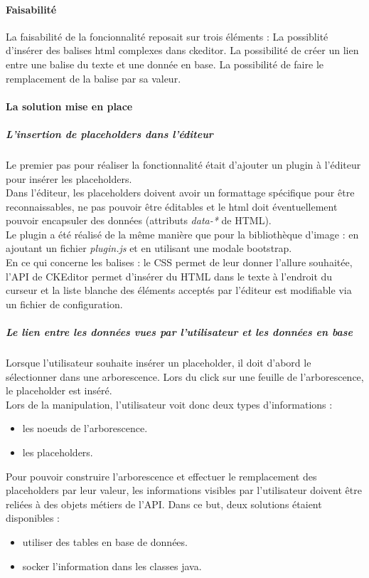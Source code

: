 \paragraph*{Faisabilité}
La faisabilité de la foncionnalité reposait sur trois éléments :
La possiblité d'insérer des balises html complexes dans ckeditor. 
La possibilité de créer un lien entre une balise du texte et une donnée en base. 
La possibilité de faire le remplacement de la balise par sa valeur.

\paragraph*{La solution mise en place}
\subparagraph*{L'insertion de placeholders dans l'éditeur}
Le premier pas pour réaliser la fonctionnalité était d'ajouter un plugin à l'éditeur pour insérer les placeholders.\\
Dans l'éditeur, les placeholders doivent avoir un formattage spécifique pour être reconnaissables, ne pas pouvoir être éditables et le html doit éventuellement pouvoir encapsuler des données (attributs \textit{data-*} de HTML).\\

Le plugin a été réalisé de la même manière que pour la bibliothèque d'image : en ajoutant un fichier \textit{plugin.js} et en utilisant une modale bootstrap.\\
En ce qui concerne les balises : le CSS permet de leur donner l'allure souhaitée, l'API de CKEditor permet d'insérer du HTML dans le texte à l'endroit du curseur et la liste blanche des éléments acceptés par l'éditeur est modifiable via un fichier de configuration.

\subparagraph*{Le lien entre les données vues par l'utilisateur et les données en base}

Lorsque l'utilisateur souhaite insérer un placeholder, il doit d'abord le sélectionner dans une arborescence. 
Lors du click sur une feuille de l'arborescence, le placeholder est inséré.  \\

Lors de la manipulation, l'utilisateur voit donc deux types d'informations : 
\begin{itemize}
\item les noeuds de l'arborescence.
\item les placeholders.
\end{itemize}

Pour pouvoir construire l'arborescence et effectuer le remplacement des placeholders par leur valeur, les informations visibles par l'utilisateur doivent être reliées à des objets métiers de l'API.
Dans ce but, deux solutions étaient disponibles : 
\begin{itemize}
\item utiliser des tables en base de données.
\item socker l'information dans les classes java. %
\end{itemize}

